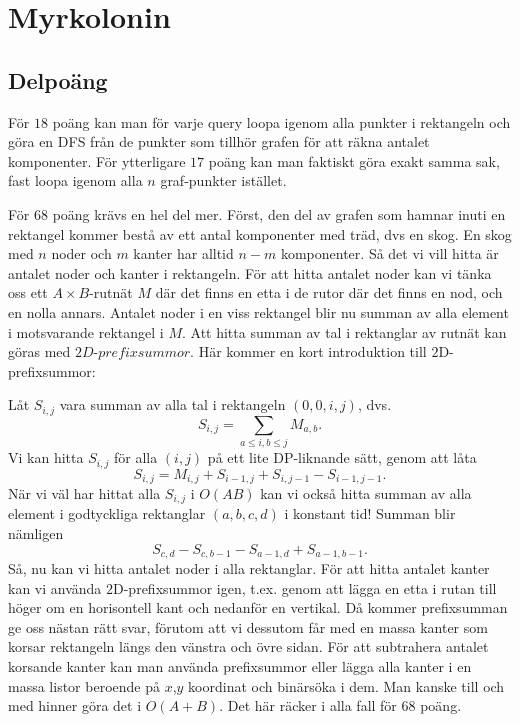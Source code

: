 \documentclass{article}
\begin{document}
\section*{Myrkolonin}

\subsection*{Delpoäng}
För $18$ poäng kan man för varje query loopa igenom alla punkter i rektangeln och göra en DFS från de punkter som tillhör grafen för att räkna antalet komponenter. För ytterligare $17$ poäng kan man faktiskt göra exakt samma sak, fast loopa igenom alla $n$ graf-punkter istället. 

För $68$ poäng krävs en hel del mer. Först, den del av grafen som hamnar inuti en rektangel kommer bestå av ett antal komponenter med träd, dvs en skog. En skog med $n$ noder och $m$ kanter har alltid $n-m$ komponenter. Så det vi vill hitta är antalet noder och kanter i rektangeln. För att hitta antalet noder kan vi tänka oss ett $A \times B$-rutnät $M$ där det finns en etta i de rutor där det finns en nod, och en nolla annars. Antalet noder i en viss rektangel blir nu summan av alla element i motsvarande rektangel i $M$. Att hitta summan av tal i rektanglar av rutnät kan göras med $\textit{2D-prefixsummor}$. Här kommer en kort introduktion till $2$D-prefixsummor:

Låt $S_{i,j}$ vara summan av alla tal i rektangeln $(0,0,i,j)$, dvs.
$$S_{i,j} = \sum_{a \leq i, b \leq j}M_{a,b}.$$
Vi kan hitta $S_{i,j}$ för alla $(i,j)$ på ett lite DP-liknande sätt, genom att låta
$$S_{i,j} = M_{i,j} + S_{i-1,j} + S_{i,j-1} - S_{i-1,j-1}.$$
När vi väl har hittat alla $S_{i,j}$ i $O(AB)$ kan vi också hitta summan av alla element i godtyckliga rektanglar $(a,b,c,d)$ i konstant tid! Summan blir nämligen
$$S_{c,d} - S_{c,b-1} - S_{a-1,d} + S_{a-1,b-1}.$$
Så, nu kan vi hitta antalet noder i alla rektanglar. För att hitta antalet kanter kan vi använda $2$D-prefixsummor igen, t.ex. genom att lägga en etta i rutan till höger om en horisontell kant och nedanför en vertikal. Då kommer prefixsumman ge oss nästan rätt svar, förutom att vi dessutom får med en massa kanter som korsar rektangeln längs den vänstra och övre sidan. För att subtrahera antalet korsande kanter kan man använda prefixsummor eller lägga alla kanter i en massa listor beroende på $x$,$y$ koordinat och binärsöka i dem. Man kanske till och med hinner göra det i $O(A+B)$. Det här räcker i alla fall för $68$ poäng.
\end{document}
